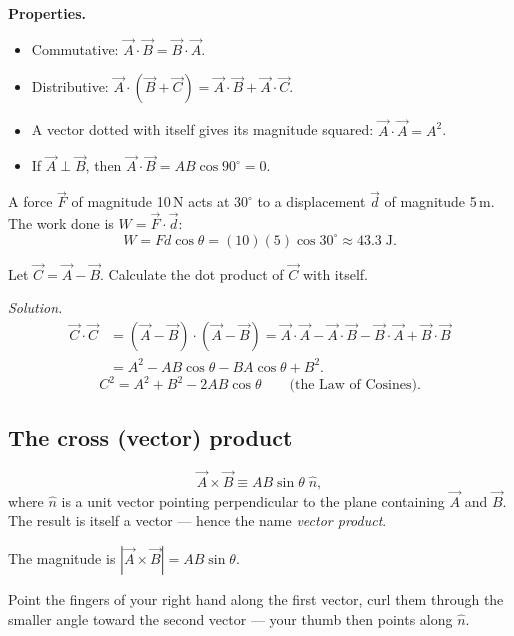 \textbf{Properties.}
\begin{itemize}
  \item Commutative: $\vec{A}\cdot\vec{B}=\vec{B}\cdot\vec{A}$.
  \item Distributive: $\vec{A}\cdot(\vec{B}+\vec{C})=\vec{A}\cdot\vec{B}+\vec{A}\cdot\vec{C}$.
  \item A vector dotted with itself gives its magnitude squared: $\vec{A}\cdot\vec{A}=A^2$.
  \item If $\vec{A}\perp\vec{B}$, then $\vec{A}\cdot\vec{B}=AB\cos90^\circ=0$.
\end{itemize}

\begin{workedexample}
A force $\vec{F}$ of magnitude 10\,N acts at $30^\circ$ to a displacement $\vec{d}$ of magnitude 5\,m.
The work done is $W=\vec{F}\cdot\vec{d}$:
\[
  W = Fd\cos\theta = (10)(5)\cos30^\circ \approx 43.3\;\text{J}.
\]
\end{workedexample}

\begin{workedexample}
Let $\vec{C}=\vec{A}-\vec{B}$. Calculate the dot product of $\vec{C}$ with itself.

\medskip
\textit{Solution.}
\begin{align*}
  \vec{C}\cdot\vec{C} &= (\vec{A}-\vec{B})\cdot(\vec{A}-\vec{B})
  = \vec{A}\cdot\vec{A} - \vec{A}\cdot\vec{B} - \vec{B}\cdot\vec{A} + \vec{B}\cdot\vec{B}\\
  &= A^2 - AB\cos\theta - BA\cos\theta + B^2.
\end{align*}
\[
  \boxed{C^2 = A^2 + B^2 - 2AB\cos\theta} \qquad\text{(the Law of Cosines).}
\]
\end{workedexample}

\subsection{The cross (vector) product}

\begin{keybox}
\[
  \vec{A}\times\vec{B} \equiv AB\sin\theta\;\hat{n},
\]
where $\hat{n}$ is a unit vector pointing perpendicular to the plane containing $\vec{A}$ and
$\vec{B}$. The result is itself a vector --- hence the name \emph{vector product}.
\end{keybox}

The magnitude is $|\vec{A}\times\vec{B}|=AB\sin\theta$.

\begin{keybox}
Point the fingers of your right hand along the first vector, curl them through the smaller
angle toward the second vector --- your thumb then points along $\hat{n}$.
\end{keybox}


